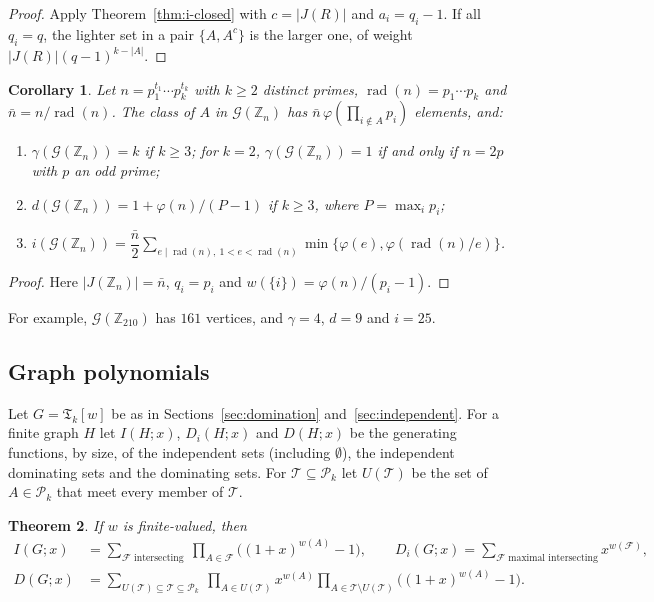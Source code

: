 \documentclass[11pt]{amsart}
\newtheorem{theorem}{Theorem}[section]
\newtheorem{corollary}[theorem]{Corollary}
\theoremstyle{definition}
\theoremstyle{remark}
\newcommand{\Jac}{J}
\newcommand{\G}{\mathcal{G}}
\newcommand{\TG}{\mathfrak{T}}
\newcommand{\Pk}{\mathcal{P}_k}
\newcommand{\F}{\mathcal{F}}
\newcommand{\Z}{\mathbb{Z}}
\newcommand{\co}[1]{{#1}^{c}}
\newcommand{\rad}{\operatorname{rad}}
\begin{document}
\begin{proof}
Apply Theorem~\ref{thm:i-closed} with $c=|\Jac(R)|$ and $a_i=q_i-1$. If all $q_i=q$, the lighter set
in a pair $\{A,\co A\}$ is the larger one, of weight $|\Jac(R)|(q-1)^{k-|A|}$.
\end{proof}

\begin{corollary}\label{cor:Zn}
Let $n=p_1^{t_1}\cdots p_k^{t_k}$ with $k\ge2$ distinct primes, $\rad(n)=p_1\cdots p_k$ and
$\bar n=n/\rad(n)$. The class of $A$ in $\G(\Z_n)$ has $\bar n\,\varphi(\prod_{i\notin A}p_i)$
elements, and:
\begin{enumerate}[label=\textup{(\roman*)}]
\item $\gamma(\G(\Z_n))=k$ if $k\ge3$; for $k=2$, $\gamma(\G(\Z_n))=1$ if and only if $n=2p$ with $p$
  an odd prime;
\item $d(\G(\Z_n))=1+\varphi(n)/(P-1)$ if $k\ge3$, where $P=\max_ip_i$;
\item $i(\G(\Z_n))=\dfrac{\bar n}{2}\displaystyle\sum_{e\mid\rad(n),\ 1<e<\rad(n)}
  \min\bigl\{\varphi(e),\varphi(\rad(n)/e)\bigr\}$.
\end{enumerate}
\end{corollary}

\begin{proof}
Here $|\Jac(\Z_n)|=\bar n$, $q_i=p_i$ and $w(\{i\})=\varphi(n)/(p_i-1)$.
\end{proof}

For example, $\G(\Z_{210})$ has $161$ vertices, and $\gamma=4$, $d=9$ and $i=25$.


\subsection{Graph polynomials}
Let $G=\TG_k[w]$ be as in Sections~\ref{sec:domination} and~\ref{sec:independent}. For a finite
graph $H$ let $I(H;x)$, $D_i(H;x)$ and $D(H;x)$ be the generating functions, by size, of
the independent sets (including $\emptyset$), the independent dominating sets and the dominating
sets. For $\mathcal T\subseteq\Pk$ let $U(\mathcal T)$ be the set of $A\in\Pk$ that meet every
member of $\mathcal T$.

\begin{theorem}\label{thm:polys}
If $w$ is finite-valued, then
\begin{align*}
I(G;x)   &= \sum_{\F\text{ intersecting}}\ \prod_{A\in\F}\bigl((1+x)^{w(A)}-1\bigr),\qquad
D_i(G;x) = \sum_{\F\text{ maximal intersecting}} x^{w(\F)},\\
D(G;x)   &= \sum_{U(\mathcal T)\subseteq\mathcal T\subseteq\Pk}\
            \prod_{A\in U(\mathcal T)}x^{w(A)}\prod_{A\in\mathcal T\setminus U(\mathcal T)}\bigl((1+x)^{w(A)}-1\bigr).
\end{align*}
\end{theorem}
\end{document}

